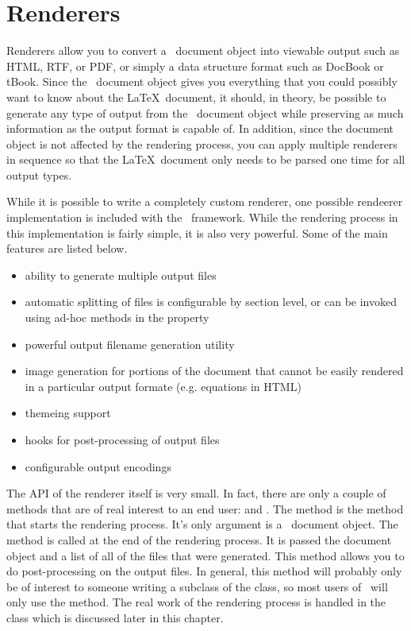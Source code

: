 
\chapter{Renderers}

Renderers allow you to convert a \plasTeX\ document object into viewable
output such as HTML, RTF, or PDF, or simply a data structure format such
as DocBook or tBook.  Since the \plasTeX\ document object gives you 
everything that you could possibly want to know about the \LaTeX\ document,
it should, in theory, be possible to generate any type of output from
the \plasTeX\ document object while preserving as much information as the
output format is capable of.  In addition, since the document object is
not affected by the rendering process, you can apply multiple renderers
in sequence so that the \LaTeX\ document only needs to be parsed one time
for all output types.

While it is possible to write a completely custom renderer, one possible
rendeerer implementation is included with the \plasTeX\ framework.
While the rendering process in this implementation is fairly simple,
it is also very powerful.  Some of the main features are listed below.
\begin{itemize}
\item ability to generate multiple output files
\item automatic splitting of files is configurable by section level,
    or can be invoked using ad-hoc methods in the 
     property
\item powerful output filename generation utility
\item image generation for portions of the document that cannot be 
    easily rendered in a particular output formate (e.g. equations in HTML)
\item themeing support
\item hooks for post-processing of output files
\item configurable output encodings
\end{itemize}

The API of the renderer itself is very small.  In fact, there are only
a couple of methods that are of real interest to an end user: 
and .  The  method is the method that starts
the rendering process.  It's only argument is a \plasTeX\ document object.
The  method is called at the end of the rendering process.
It is passed the document object and a list of all of the files that were
generated.  This method allows you to do post-processing on the output files.
In general, this method will probably only be of interest to someone 
writing a subclass of the  class, so most users of 
\plasTeX\ will only use the  method.  The real work of
the rendering process is handled in the  class which
is discussed later in this chapter.

